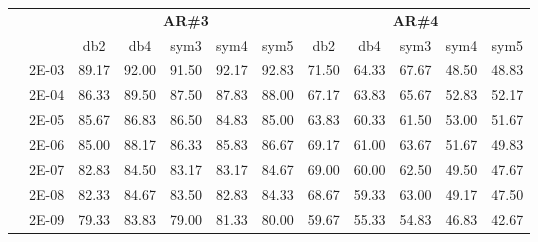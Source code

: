 \begin{table}[H]
\begin{tabular}{|c|c|c c c c c|c c c c c|}
\cline{3-12}
\multicolumn{2}{c}{} & \multicolumn{5}{|c|}{\textbf{AR\#3}}  & \multicolumn{5}{c|}{\textbf{AR\#4}} \\\cline{3-12}
\multicolumn{2}{c}{}  & \multicolumn{1}{|c}{db2} & db4 & sym3 & sym4 & sym5 & db2 & db4& sym3 & sym4 & sym5 \\\hline
\multicolumn{1}{|c|}{ \multirow{6}{*}{\rotatebox[origin=c]{90}{\textbf{Sigma}}} }
&2E-03&	89.17	&92.00	&91.50	&92.17	&92.83	&71.50	&64.33	&67.67	&48.50	&48.83	\\\cline{2-12}
&2E-04&	86.33	&89.50	&87.50	&87.83	&88.00	&67.17	&63.83	&65.67	&52.83	&52.17	\\\cline{2-12}
&2E-05&	85.67	&86.83	&86.50	&84.83	&85.00	&63.83	&60.33	&61.50	&53.00	&51.67	\\\cline{2-12}
&2E-06&	85.00	&88.17	&86.33	&85.83	&86.67	&69.17	&61.00	&63.67	&51.67	&49.83	\\\cline{2-12}
&2E-07&	82.83	&84.50	&83.17	&83.17	&84.67	&69.00	&60.00	&62.50	&49.50	&47.67	\\\cline{2-12}
&2E-08&	82.33	&84.67	&83.50	&82.83	&84.33	&68.67	&59.33	&63.00	&49.17	&47.50	\\\cline{2-12}
&2E-09&	79.33	&83.83	&79.00	&81.33	&80.00	&59.67	&55.33	&54.83	&46.83	&42.67	\\\midrule
\end{tabular}

\end{table}


